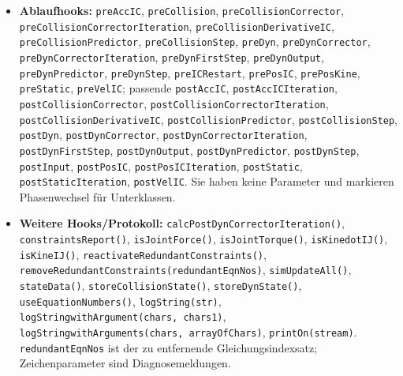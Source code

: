 \documentclass[
  12pt
]{book}
\begin{document}
\begin{itemize}
  \texttt{checkForDynDiscontinuityBetweenand(tprev,\ t)},
  \texttt{discontinuityAtaddTypeTo(t,\ disconTypes)},
  \texttt{discontinuityAtICAddTo(disconTypes)},
  \texttt{normalImpulse(imp)},
  \texttt{suggestSmallerOrAcceptCollisionFirstStepSize(hnew)},
  \texttt{suggestSmallerOrAcceptCollisionStepSize(hnew)},
  \texttt{suggestSmallerOrAcceptDynFirstStepSize(hnew)},
  \texttt{suggestSmallerOrAcceptDynStepSize(hnew)}. Die Argumente sind
  vorheriger/neuer Impuls, alte/neue Zeit, Ereignistypcontainer, Impuls
  beziehungsweise angefragte neue Schrittweite.
\item
  \textbf{Ablaufhooks:} \texttt{preAccIC}, \texttt{preCollision},
  \texttt{preCollisionCorrector},
  \texttt{preCollisionCorrectorIteration},
  \texttt{preCollisionDerivativeIC}, \texttt{preCollisionPredictor},
  \texttt{preCollisionStep}, \texttt{preDyn}, \texttt{preDynCorrector},
  \texttt{preDynCorrectorIteration}, \texttt{preDynFirstStep},
  \texttt{preDynOutput}, \texttt{preDynPredictor}, \texttt{preDynStep},
  \texttt{preICRestart}, \texttt{prePosIC}, \texttt{prePosKine},
  \texttt{preStatic}, \texttt{preVelIC}; passende \texttt{postAccIC},
  \texttt{postAccICIteration}, \texttt{postCollisionCorrector},
  \texttt{postCollisionCorrectorIteration},
  \texttt{postCollisionDerivativeIC}, \texttt{postCollisionPredictor},
  \texttt{postCollisionStep}, \texttt{postDyn},
  \texttt{postDynCorrector}, \texttt{postDynCorrectorIteration},
  \texttt{postDynFirstStep}, \texttt{postDynOutput},
  \texttt{postDynPredictor}, \texttt{postDynStep}, \texttt{postInput},
  \texttt{postPosIC}, \texttt{postPosICIteration}, \texttt{postStatic},
  \texttt{postStaticIteration}, \texttt{postVelIC}. Sie haben keine
  Parameter und markieren Phasenwechsel für Unterklassen.
\item
  \textbf{Weitere Hooks/Protokoll:}
  \texttt{calcPostDynCorrectorIteration()},
  \texttt{constraintsReport()}, \texttt{isJointForce()},
  \texttt{isJointTorque()}, \texttt{isKinedotIJ()}, \texttt{isKineIJ()},
  \texttt{reactivateRedundantConstraints()},
  \texttt{removeRedundantConstraints(redundantEqnNos)},
  \texttt{simUpdateAll()}, \texttt{stateData()},
  \texttt{storeCollisionState()}, \texttt{storeDynState()},
  \texttt{useEquationNumbers()}, \texttt{logString(str)},
  \texttt{logStringwithArgument(chars,\ chars1)},
  \texttt{logStringwithArguments(chars,\ arrayOfChars)},
  \texttt{printOn(stream)}. \texttt{redundantEqnNos} ist der zu
  entfernende Gleichungsindexsatz; Zeichenparameter sind
  Diagnosemeldungen.
\end{itemize}
\end{document}
